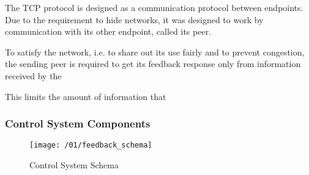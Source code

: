 The TCP protocol is designed as a communication protocol between endpoints. Due to the requirement
to hide networks, it was designed to work by communication with its other endpoint, called its peer.

To satisfy the network, i.e. to share out its use fairly and to prevent congestion, the sending peer
is required to get its feedback response only from information received by the

This limits the amount of information that




\subsubsection{Control System Components}

\begin{figure}[H]
\centering
\texttt{[image: /01/feedback\_schema]}
\caption{Control System Schema}
\label{fig:feedback_schema}
\end{figure}






